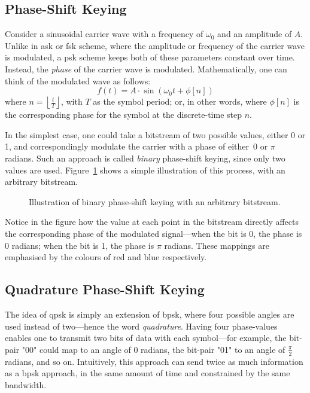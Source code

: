 \documentclass[class=report,11pt,crop=false]{standalone}
\begin{document}
\subsection{Phase-Shift Keying}
Consider a sinusoidal carrier wave with a frequency of \(\omega_0\) and an amplitude of \(A\). Unlike in \gls{ask} or \gls{fsk} scheme, where the amplitude or frequency of the carrier wave is modulated, a \gls{psk} scheme keeps both of these parameters constant over time. Instead, the \emph{phase} of the carrier wave is modulated. Mathematically, one can think of the modulated wave as follows:
\begin{equation}
    f(t) = A \cdot \sin(\omega_0t + \phi[n])
\end{equation}
where \(n=\left\lfloor \frac{t}{T} \right\rfloor\), with \(T\) as the symbol period; or, in other words, where \(\phi[n]\) is the corresponding phase for the symbol at the discrete-time step \(n\).

In the simplest case, one could take a bitstream of two possible values, either 0 or 1, and correspondingly modulate the carrier with a phase of either~\(0\) or \(\pi\) radians. Such an approach is called \emph{binary} phase-shift keying, since only two values are used. Figure~\ref{fig:binary-psk} shows a simple illustration of this process, with an arbitrary bitstream.

\begin{figure}[htbp]
    \centering
    \captionsetup{type=figure}
    \def\svgwidth{1\linewidth}
    {\scriptsize
        }
    \caption{Illustration of binary phase-shift keying with an arbitrary bitstream.}
    \label{fig:binary-psk}
\end{figure}

Notice in the figure how the value at each point in the bitstream directly affects the corresponding phase of the modulated signal---when the bit is 0, the phase is \(0\) radians; when the bit is 1, the phase is \(\pi\) radians. These mappings are emphasised by the colours of red and blue respectively.

\subsection{Quadrature Phase-Shift Keying}
The idea of \gls{qpsk} is simply an extension of \gls{bpsk}, where four possible angles are used instead of two---hence the word \emph{quadrature}. Having four phase-values enables one to transmit two bits of data with each symbol---for example, the bit-pair "00" could map to an angle of 0 radians, the bit-pair "01" to an angle of \(\frac{\pi}{2}\) radians, and so on. Intuitively, this approach can send twice as much information as a \gls{bpsk} approach, in the same amount of time and constrained by the same bandwidth.
\end{document}
